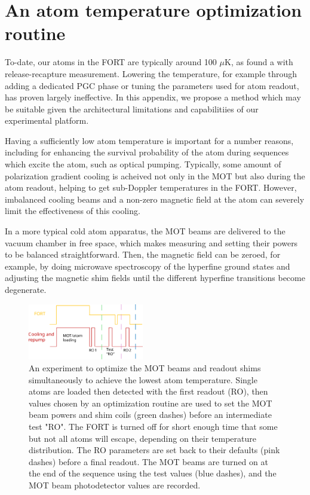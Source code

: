 \chapter{An atom temperature optimization routine}\label{ch:tempopt}

To-date, our atoms in the FORT are typically around 100 $\mu \mathrm{K}$, as found a with release-recapture measurement\cite{Tuchendler2008}. Lowering the temperature, for example through adding a dedicated PGC phase or tuning the parameters used for atom readout, has proven largely ineffective. In this appendix, we propose a method which may be suitable given the architectural limitations and capabilitiies of our experimental platform.

Having a sufficiently low atom temperature is important for a number reasons, including for enhancing the survival probability of the atom during sequences which excite the atom, such as optical pumping. Typically, some amount of polarization gradient cooling is acheived not only in the MOT but also during the atom readout, helping to get sub-Doppler temperatures in the FORT. However, imbalanced cooling beams and a non-zero magnetic field at the atom can severely limit the effectiveness of this cooling\cite{chin2017polarization}.

In a more typical cold atom apparatus, the MOT beams are delivered to the vacuum chamber in free space, which makes measuring and setting their powers to be balanced straightforward. Then, the magnetic field can be zeroed, for example, by doing microwave spectroscopy of the hyperfine ground states and adjusting the magnetic shim fields until the different hyperfine transitions become degenerate\cite{Young2022thesis}.

\begin{figure}[!ht]
    \centering
    \includegraphics[width=0.45\textwidth]{Images/beam_balance_and_shims_optimization.pdf}
    \caption{An experiment to optimize the MOT beams and readout shims simultaneously to achieve the lowest atom temperature. Single atoms are loaded then detected with the first readout (RO), then values chosen by an optimization routine are used to set the MOT beam powers and shim coils (green dashes) before an intermediate test "RO". The FORT is turned off for short enough time that some but not all atoms will escape, depending on their temperature distribution. The RO parameters are set back to their defaults (pink dashes) before a final readout. The MOT beams are turned on at the end of the sequence using the test values (blue dashes), and the MOT beam photodetector values are recorded.}
    \label{fig:beam_and_shims_optimization}
\end{figure}

